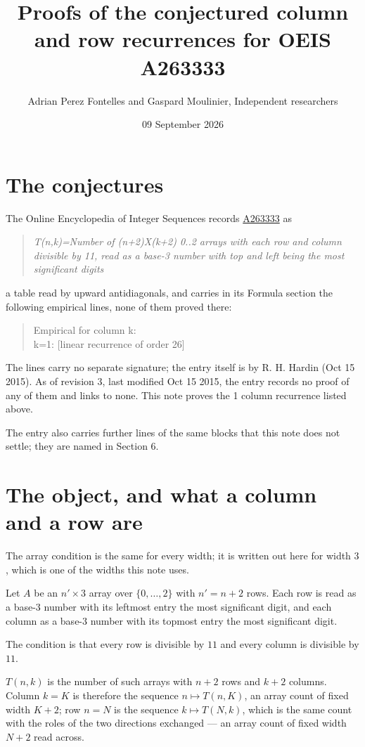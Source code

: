 \documentclass[11pt]{article}
\title{Proofs of the conjectured column and row recurrences for OEIS A263333}
\author{Adrian Perez Fontelles and Gaspard Moulinier, Independent researchers}
\date{09 September 2026}
\theoremstyle{definition}
\begin{document}
\maketitle
\section{The conjectures}

The Online Encyclopedia of Integer Sequences records \href{https://oeis.org/A263333}{A263333} as

\begin{quote}\itshape T(n,k)=Number of (n+2)X(k+2) 0..2 arrays with each row and column divisible by 11, read as a base-3 number with top and left being the most significant digits\end{quote}

a table read by upward antidiagonals, and carries in its Formula section the following empirical lines, none of them proved there:

\begin{quote}\ttfamily Empirical for column k:\\
k=1: [linear recurrence of order 26]\end{quote}

The lines carry no separate signature; the entry itself is by R. H. Hardin (Oct 15 2015). As of revision 3, last modified Oct 15 2015, the entry records no proof of any of them and links to none. This note proves the 1 column recurrence listed above.

The entry also carries further lines of the same blocks that this note does not settle; they are named in Section 6.

\section{The object, and what a column and a row are}

The array condition is the same for every width; it is written out here for width $3$, which is one of the widths this note uses.

Let $A$ be an $n' \times 3$ array over $\{0,\dots,2\}$ with $n' = n + 2$ rows. Each row is read as a base-$3$ number with its leftmost entry the most significant digit, and each column as a base-$3$ number with its topmost entry the most significant digit.

The condition is that every row is divisible by $11$ and every column is divisible by $11$.

$T(n,k)$ is the number of such arrays with $n + 2$ rows and $k + 2$ columns. Column $k = K$ is therefore the sequence $n \mapsto T(n,K)$, an array count of fixed width $K + 2$; row $n = N$ is the sequence $k \mapsto T(N,k)$, which is the same count with the roles of the two directions exchanged --- an array count of fixed width $N + 2$ read across.
\end{document}
